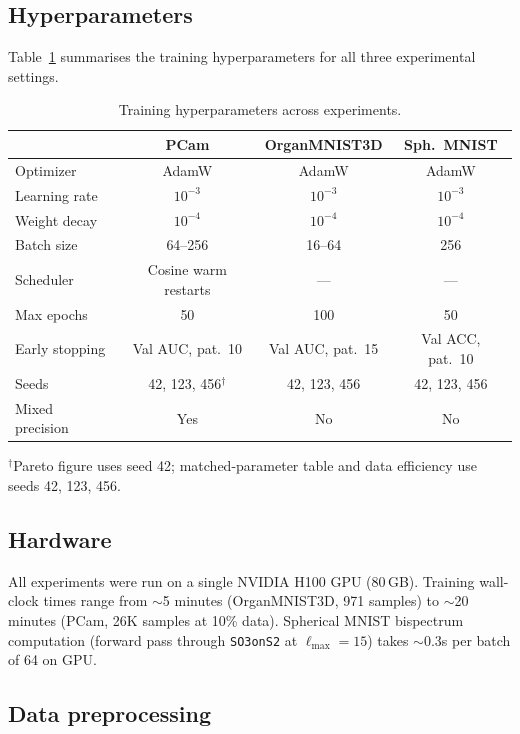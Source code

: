 \documentclass{article}
\theoremstyle{definition}
\theoremstyle{remark}
\theoremstyle{definition}
\begin{document}
\subsection{Hyperparameters}

Table~\ref{tab:hyperparams} summarises the training hyperparameters
for all three experimental settings.

\begin{table}[h]
  \caption{Training hyperparameters across experiments.}
  \label{tab:hyperparams}
  \centering
  \small
  \setlength{\tabcolsep}{4pt}
  \begin{tabular}{lccc}
    \toprule
    & PCam & OrganMNIST3D & Sph.\ MNIST \\
    \midrule
    Optimizer      & AdamW & AdamW & AdamW \\
    Learning rate  & $10^{-3}$ & $10^{-3}$ & $10^{-3}$ \\
    Weight decay   & $10^{-4}$ & $10^{-4}$ & $10^{-4}$ \\
    Batch size     & 64--256 & 16--64 & 256 \\
    Scheduler      & Cosine warm restarts & --- & --- \\
    Max epochs     & 50 & 100 & 50 \\
    Early stopping & Val AUC, pat.\ 10 & Val AUC, pat.\ 15 & Val ACC, pat.\ 10 \\
    Seeds          & 42, 123, 456$^\dagger$ & 42, 123, 456 & 42, 123, 456 \\
    Mixed precision & Yes & No & No \\
    \bottomrule
  \end{tabular}

  \vspace{0.3em}
  {\small $^\dagger$Pareto figure uses seed 42; matched-parameter table and data efficiency use seeds 42, 123, 456.}
\end{table}

\subsection{Hardware}

All experiments were run on a single NVIDIA H100 GPU (80\,GB).
Training wall-clock times range from ${\sim}$5 minutes (OrganMNIST3D,
971 samples) to ${\sim}$20 minutes (PCam, 26K samples at 10\% data).
Spherical MNIST bispectrum computation (forward pass through
\texttt{SO3onS2} at $\ell_{\max} = 15$) takes ${\sim}$0.3s per batch
of 64 on GPU.

\subsection{Data preprocessing}
\end{document}
